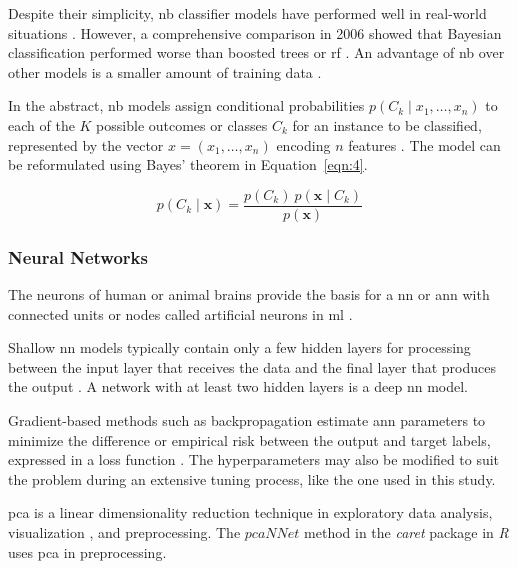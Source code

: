 \documentclass[sn-mathphys-num]{sn-jnl}%
\begin{document}
Despite their simplicity, \acrshort{nb} classifier models have performed well in real-world situations \cite{Metsis2006}. However, a comprehensive comparison in 2006 showed that Bayesian classification performed worse than boosted trees or \acrfull{rf} \cite{Caruana2006}. An advantage of \acrshort{nb} over other models is a smaller amount of training data \cite{John2013, Mccallum2001}.

In the abstract, \acrshort{nb} models assign conditional probabilities $p(C_{k}\mid x_{1},\ldots, x_{n})$ to each of the $K$ possible outcomes or classes $C_{k}$ for an instance to be classified, represented by the vector $x = (x_{1},\ldots, x_{n})$ encoding $n$ features \cite{Murty2011}. The model can be reformulated using Bayes' theorem in Equation~\ref{eqn:4}.

\begin{equation}
	p(C_{k}\mid \mathbf{x})={\frac{p(C_{k})\ p(\mathbf{x} \mid C_{k})}{p(\mathbf{x})}}
	\label{eqn:4}
\end{equation}

\subsubsection{Neural Networks}

The neurons of human or animal brains provide the basis for a \acrfull{nn} or \acrfull{ann} with connected units or nodes called artificial neurons in \acrlong{ml} \cite{mitExplainedNeural, brahme2014comprehensive}. 

Shallow \acrshort{nn} models typically contain only a few hidden layers for processing between the input layer that receives the data and the final layer that produces the output \cite{olden2002illuminating, ozesmi1999artificial}. A network with at least two hidden layers \cite{bishop2006pattern} is a deep \acrshort{nn} model.

Gradient-based methods such as backpropagation estimate \acrshort{ann} parameters \cite{vapnik2013nature} to minimize the difference or empirical risk between the output and target labels, expressed in a loss function \cite{goodfellow2016deep}. The hyperparameters may also be modified to suit the problem \cite{probst2019tunability} during an extensive tuning process, like the one used in this study.

\acrfull{pca} \cite{pearson1901liii, stewart2019introduction} is a linear dimensionality reduction technique in exploratory data analysis, visualization \cite{jolliffe2016principal}, and preprocessing. The $pcaNNet$ method in the \textit{caret} package in \textit{R} \cite{ripley2007pattern} uses \acrshort{pca} in preprocessing.
\end{document}
